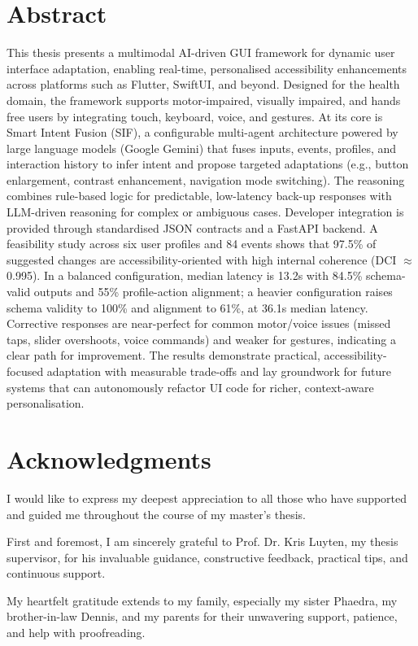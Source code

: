 \documentclass[openany]{book}
\begin{document}
\chapter*{Abstract}
This thesis presents a multimodal AI-driven GUI framework for dynamic user interface adaptation, enabling real-time, personalised accessibility enhancements across platforms such as Flutter, SwiftUI, and beyond. Designed for the health domain, the framework supports motor-impaired, visually impaired, and hands free users by integrating touch, keyboard, voice, and gestures. At its core is Smart Intent Fusion (SIF), a configurable multi-agent architecture powered by large language models (Google Gemini) that fuses inputs, events, profiles, and interaction history to infer intent and propose targeted adaptations (e.g., button enlargement, contrast enhancement, navigation mode switching). The reasoning combines rule-based logic for predictable, low-latency back-up responses with LLM-driven reasoning for complex or ambiguous cases. Developer integration is provided through standardised JSON contracts and a FastAPI backend.
A feasibility study across six user profiles and 84 events shows that 97.5\% of suggested changes are accessibility-oriented with high internal coherence (DCI $\approx$ 0.995). In a balanced configuration, median latency is 13.2s with 84.5\% schema-valid outputs and 55\% profile-action alignment; a heavier configuration raises schema validity to 100\% and alignment to 61\%, at 36.1s median latency. Corrective responses are near-perfect for common motor/voice issues (missed taps, slider overshoots, voice commands) and weaker for gestures, indicating a clear path for improvement. The results demonstrate practical, accessibility-focused adaptation with measurable trade-offs and lay groundwork for future systems that can autonomously refactor UI code for richer, context-aware personalisation.

\chapter*{Acknowledgments}
I would like to express my deepest appreciation to all those who have supported and guided me throughout the course of my master’s thesis.

First and foremost, I am sincerely grateful to Prof. Dr. Kris Luyten, my thesis supervisor, for his invaluable guidance, constructive feedback, practical tips, and continuous support.

My heartfelt gratitude extends to my family, especially my sister Phaedra, my brother-in-law Dennis, and my parents for their unwavering support, patience, and help with proofreading.
\end{document}
